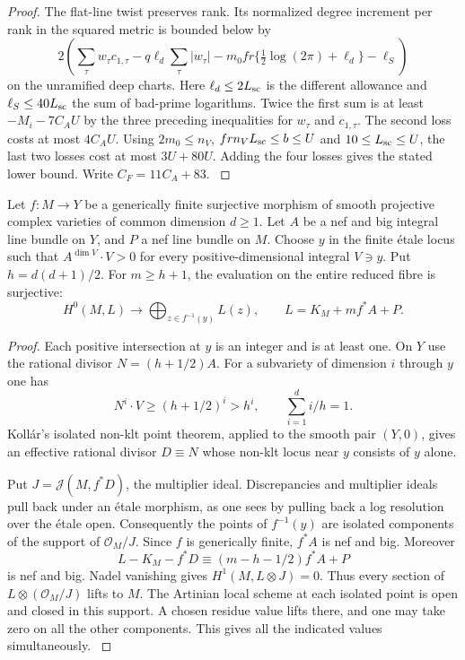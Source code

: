 \begin{proof}
The flat-line twist preserves rank. Its normalized degree
increment per rank in the squared metric is bounded below by
\[
 2\left(\sum_\tau w_\tau c_{1,\tau}
       -q\ell_d\sum_\tau|w_\tau|
       -m_0fr\{\tfrac12\log(2\pi)+\ell_d\}-\ell_S\right)
\]
on the unramified deep charts. Here \(\ell_d\le2L_{\rm sc}\)
is the different allowance and \(\ell_S\le40L_{\rm sc}\)
the sum of bad-prime logarithms. Twice the first sum is at
least \(-M_i-7C_AU\) by the three preceding inequalities for \(w_\tau\) and \(c_{1,\tau}\).
The second loss costs at most \(4C_A U\). Using
\(2m_0\le n_V\), \(frn_V L_{\rm sc}\le b\le U\) and
\(10\le L_{\rm sc}\le U\), the last two losses cost at most
\(3U+80U\). Adding the four losses gives the stated lower bound.
Write \(C_F=11C_A+83\). \label{cor:covolume-component-transfer-12}
\end{proof}

\begin{auxlemma}
\label{lem:adjoint-etale-fibre}
Let \(f:M\to Y\) be a generically finite surjective morphism of smooth
projective complex varieties of common dimension \(d\ge1\). Let \(A\)
be a nef and big integral line bundle on \(Y\), and \(P\) a nef line
bundle on \(M\). Choose \(y\) in the finite \'etale locus such that
\(A^{\dim V}\cdot V>0\) for every positive-dimensional integral
\(V\ni y\). Put \(h=d(d+1)/2\). For \(m\ge h+1\), the evaluation
on the entire reduced fibre is surjective:
\[
 H^0(M,L)\longrightarrow\bigoplus_{z\in f^{-1}(y)} L(z),
 \qquad L=K_M+m f^*A+P .
\]
\end{auxlemma}
\begin{proof}
Each positive intersection at \(y\) is an integer and is at least
one. On \(Y\) use the rational divisor \(N=(h+1/2)A\). For a
subvariety of dimension \(i\) through \(y\) one has
\[
       N^i\cdot V\ge(h+1/2)^i>h^i,\qquad
       \sum_{i=1}^d i/h=1 .
\]
Koll\'ar's isolated non-klt point theorem, applied to the smooth
pair \((Y,0)\), gives an effective rational divisor \(D\equiv N\)
whose non-klt locus near \(y\) consists of \(y\) alone.
\cite[Theorem~6.4]{kollar-pairs-adjoint}

Put \(J=\mathcal J(M,f^*D)\), the multiplier ideal. Discrepancies
and multiplier ideals pull back under an \'etale morphism, as one
sees by pulling back a log resolution over the \'etale open.
Consequently the points of \(f^{-1}(y)\) are isolated components of
the support of \(\mathcal O_M/J\). Since \(f\) is generically finite,
\(f^*A\) is nef and big. Moreover
\[
    L-K_M-f^*D\equiv (m-h-1/2) f^*A+P
\]
is nef and big. Nadel vanishing gives \(H^1(M,L\otimes J)=0\).
Thus every section of \(L\otimes(\mathcal O_M/J)\) lifts to \(M\).
The Artinian local scheme at each isolated point is open and closed
in this support. A chosen residue value lifts there, and one may
take zero on all the other components. This gives all the indicated
values simultaneously. \cite[Theorem~2.16 and proof of Theorem~5.8]{kollar-pairs-adjoint}
\end{proof}

